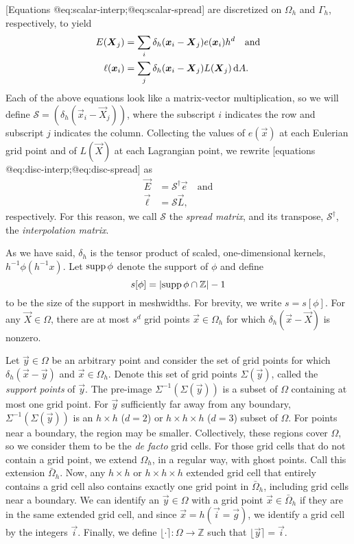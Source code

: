 [Equations @eq:scalar-interp;@eq:scalar-spread] are discretized on $\Omega_h$
and $\Gamma_h$, respectively, to yield
\begin{align}
    \label{eq:disc-interp}
    E(\vec{X}_j) &= \sum_i \delta_h(\vec{x}_i-\vec{X}_j)e(\vec{x}_i) h^d \quad \text{and} \\
    \label{eq:disc-spread}
    \ell(\vec{x}_i) &= \sum_j \delta_h(\vec{x}_i-\vec{X}_j)L(\vec{X}_j) \d A.
\end{align}
Each of the above equations look like a matrix-vector multiplication, so we 
will define $\mathcal{S}=(\delta_h(\vec{x}_i-\vec{X}_j))$, where the subscript
$i$ indicates the row and subscript $j$ indicates the column. Collecting the
values of $e(\vec{x})$ at each Eulerian grid point and of $L(\vec{X})$ at
each Lagrangian point, we rewrite [equations @eq:disc-interp;@eq:disc-spread]
as
\begin{align}
    \label{eq:matrix-interp}
    \vec{E} &= \mathcal{S}^\dagger\vec{e} \quad\text{and} \\
    \label{eq:matrix-spread}
    \vec{\ell} &= \mathcal{S}\vec{L},
\end{align}
respectively. For this reason, we call $\mathcal{S}$ the \emph{spread matrix},
and its transpose, $\mathcal{S}^\dagger$, the \emph{interpolation matrix}.

As we have said, $\delta_h$ is the tensor product of scaled, one-dimensional
kernels, $h^{-1}\phi(h^{-1}x)$. Let $\mathrm{supp}\mskip\thinmuskip\phi$
denote the support of $\phi$ and define
\begin{equation}
    s[\phi] = |\mathrm{supp}\mskip\thinmuskip\phi\cap\mathbb{Z}|-1
\end{equation}
to be the size of the support in meshwidths. For brevity, we write $s=s[\phi]$.
For any $\vec{X}\in\Omega$, there are at most $s^d$ grid points
$\vec{x}\in\Omega_h$ for which $\delta_h(\vec{x}-\vec{X})$ is nonzero.

Let $\vec{y}\in\Omega$ be an arbitrary point and consider the set of grid
points for which $\delta_h(\vec{x}-\vec{y})$ and $\vec{x}\in\Omega_h$. Denote
this set of grid points $\Sigma(\vec{y})$, called the \emph{support points}
of $\vec{y}$. The pre-image $\Sigma^{-1}(\Sigma(\vec{y}))$ is a subset of
$\Omega$ containing at most one grid point. For $\vec{y}$ sufficiently far away
from any boundary, $\Sigma^{-1}(\Sigma(\vec{y}))$ is an $h \times h$ ($d=2$) or
$h \times h \times h$ ($d=3$) subset of $\Omega$. For points near a boundary,
the region may be smaller. Collectively, these regions cover $\Omega$, so we
consider them to be the \emph{de facto} grid cells. For those grid cells that
do not contain a grid point, we extend $\Omega_h$, in a regular way, with ghost
points. Call this extension $\bar{\Omega}_h$. Now, any $h \times h$ or
$h \times h \times h$ extended grid cell that entirely contains a grid cell
also contains exactly one grid point in $\bar{\Omega}_h$, including grid cells
near a boundary. We can identify an $\vec{y}\in\Omega$ with a grid point
$\vec{x}\in\bar{\Omega}_h$ if they are in the same extended grid cell, and
since $\vec{x}=h(\vec{i}=\vec{g})$, we identify a grid cell by the integers
$\vec{i}$. Finally, we define $\lfloor\cdot\rceil:\Omega\to\mathbb{Z}$ such
that $\lfloor\vec{y}\rceil = \vec{i}$.

